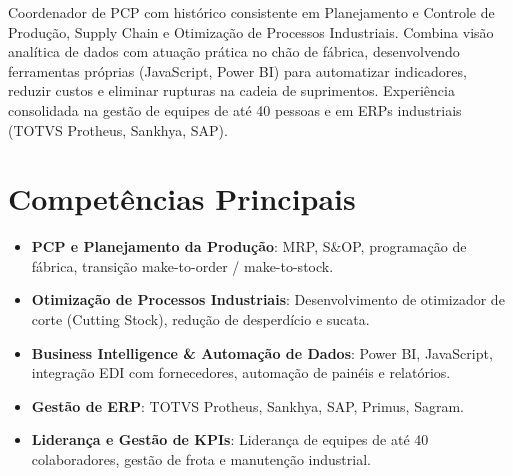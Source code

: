 \documentclass[11pt,a4paper,sans]{moderncv}
\begin{document}
\makecvtitle


\vspace{6pt}
\small{Coordenador de PCP com histórico consistente em Planejamento e Controle de Produção, Supply Chain e Otimização de Processos Industriais. Combina visão analítica de dados com atuação prática no chão de fábrica, desenvolvendo ferramentas próprias (JavaScript, Power BI) para automatizar indicadores, reduzir custos e eliminar rupturas na cadeia de suprimentos. Experiência consolidada na gestão de equipes de até 40 pessoas e em ERPs industriais (TOTVS Protheus, Sankhya, SAP).}


\section{Competências Principais}
\vspace{1pt}
\begin{itemize}

\item \textbf{PCP e Planejamento da Produção}: MRP, S\&OP, programação de fábrica, transição make-to-order / make-to-stock.

\item \textbf{Otimização de Processos Industriais}: Desenvolvimento de otimizador de corte (Cutting Stock), redução de desperdício e sucata.

\item \textbf{Business Intelligence \& Automação de Dados}: Power BI, JavaScript, integração EDI com fornecedores, automação de painéis e relatórios.

\item \textbf{Gestão de ERP}: TOTVS Protheus, Sankhya, SAP, Primus, Sagram.

\item \textbf{Liderança e Gestão de KPIs}: Liderança de equipes de até 40 colaboradores, gestão de frota e manutenção industrial.

\end{itemize}

\end{document}
